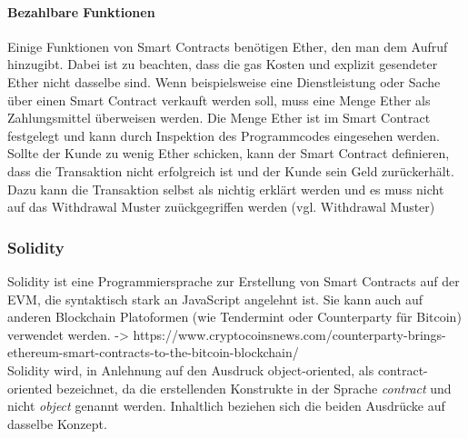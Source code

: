 \paragraph{Bezahlbare Funktionen}
Einige Funktionen von Smart Contracts benötigen Ether, den man dem Aufruf hinzugibt. Dabei ist zu beachten, dass die gas Kosten und explizit gesendeter Ether nicht dasselbe sind. Wenn beispielsweise eine Dienstleistung oder Sache über einen Smart Contract verkauft werden soll, muss eine Menge Ether als Zahlungsmittel überweisen werden. Die Menge Ether ist im Smart Contract festgelegt und kann durch Inspektion des Programmcodes eingesehen werden. Sollte der Kunde zu wenig Ether schicken, kann der Smart Contract definieren, dass die Transaktion nicht erfolgreich ist und der Kunde sein Geld zurückerhält. Dazu kann die Transaktion selbst als nichtig erklärt werden und es muss nicht auf das Withdrawal Muster zuückgegriffen werden (vgl. Withdrawal Muster)

\subsubsection{Solidity}
Solidity ist eine Programmiersprache zur Erstellung von Smart Contracts auf der \acrfull{EVM}, die syntaktisch stark an JavaScript angelehnt ist. Sie kann auch auf anderen Blockchain Platoformen (wie Tendermint oder Counterparty für Bitcoin) verwendet werden. -> https://www.cryptocoinsnews.com/counterparty-brings-ethereum-smart-contracts-to-the-bitcoin-blockchain/\\Solidity wird, in Anlehnung auf den Ausdruck object-oriented, als contract-oriented bezeichnet, da die erstellenden Konstrukte in der Sprache \emph{contract} und nicht \emph{object} genannt werden. Inhaltlich beziehen sich die beiden Ausdrücke auf dasselbe Konzept.

